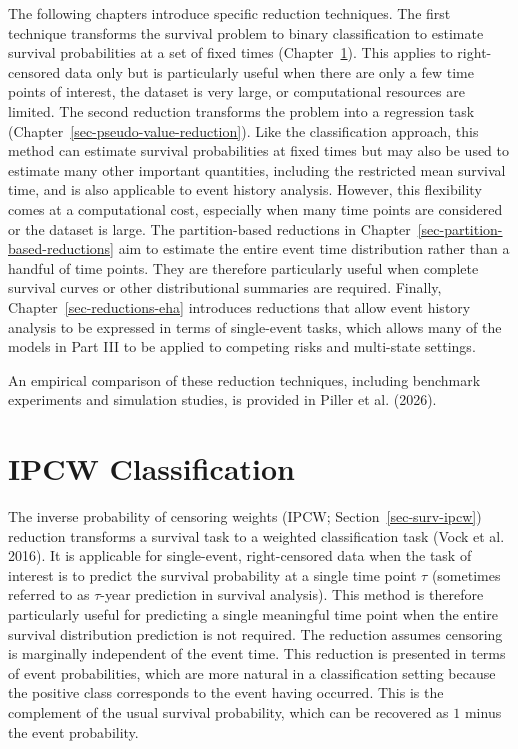 \documentclass[
  letterpaper,
  krantz2]{style/krantz}
\begin{document}
The following chapters introduce specific reduction techniques. The
first technique transforms the survival problem to binary classification
to estimate survival probabilities at a set of fixed
times
(Chapter~\ref{sec-ipcw-reduction}). This applies to right-censored data
only but is particularly useful when there are only a few time points of
interest, the dataset is very large, or computational resources are
limited. The second reduction transforms the problem into a regression
task
(Chapter~\ref{sec-pseudo-value-reduction}). Like the classification
approach, this method can estimate survival probabilities at fixed times
but may also be used to estimate many other important quantities,
including the restricted mean survival time, and is also applicable to
event history analysis. However, this flexibility comes at a
computational cost, especially when many time points are considered or
the dataset is large. The partition-based reductions in
Chapter~\ref{sec-partition-based-reductions} aim to estimate the entire
event time distribution rather than a handful of time
points. They are therefore
particularly useful when complete survival curves or other
distributional summaries are required. Finally,
Chapter~\ref{sec-reductions-eha} introduces reductions that allow event
history analysis to be expressed in terms of single-event tasks, which
allows many of the models in Part III to be applied to competing risks
and multi-state settings.

An empirical comparison of these reduction techniques, including
benchmark experiments and simulation studies, is provided in Piller et
al. (2026).

\chapter{IPCW Classification}\label{sec-ipcw-reduction}

The inverse probability of censoring weights (IPCW;
Section~\ref{sec-surv-ipcw}) reduction transforms a survival task to a
weighted classification task (Vock et al.
2016). It is applicable
for single-event, right-censored data when the task of interest is to
predict the survival probability at a single time point \(\tau\)
(sometimes referred to as \(\tau\)-year prediction in survival
analysis).
This method is therefore particularly useful for predicting a single
meaningful time point when the entire survival distribution prediction
is not required. The reduction assumes censoring is marginally
independent of the event time. This reduction is presented in terms of
event probabilities, which are more natural in a classification setting
because the positive class corresponds to the event having occurred.
This is the complement of the usual survival probability, which can be
recovered as \(1\) minus the event probability.
\end{document}

